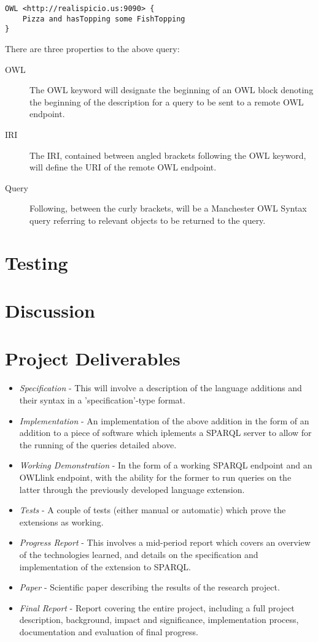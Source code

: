 \documentclass{article}
\begin{document}
\begin{lstlisting}
OWL <http://realispicio.us:9090> {
    Pizza and hasTopping some FishTopping
}
\end{lstlisting}

There are three properties to the above query:

\begin{description}
    \item[OWL] The OWL keyword will designate the beginning of an OWL block
    denoting the beginning of the description for a query to be sent to a remote
    OWL endpoint.
    \item[IRI] The IRI, contained between angled brackets following the OWL
    keyword, will define the URI of the remote OWL endpoint.
    \item[Query] Following, between the curly brackets, will be a Manchester OWL
    Syntax query referring to relevant objects to be returned to the query.
\end{description}

\section{Testing}

\section{Discussion}

\section{Project Deliverables}

\begin{itemize}
  \item \emph{Specification} - This will involve a description of the language additions 
  and their syntax in a 'specification'-type format. 
  \item \emph{Implementation} - An implementation of the above addition in the
  form of an addition to a piece of software which iplements a SPARQL server to
  allow for the running of the queries detailed above.
  \item \emph{Working Demonstration} - In the form of a working SPARQL endpoint
  and an OWLlink endpoint, with the ability for the former to run queries on the
  latter through the previously developed language extension.
  \item \emph{Tests} - A couple of tests (either manual or automatic) which
  prove the extensions as working.
  \item \emph{Progress Report} - This involves a mid-period report which covers
  an overview of the technologies learned, and details on the specification and 
  implementation of the extension to SPARQL.
  \item \emph{Paper} - Scientific paper describing the results of the research
  project.
  \item \emph{Final Report} - Report covering the entire project, including
  a full project description, background, impact and significance, 
  implementation process, documentation and evaluation of final progress.
\end{itemize}
\end{document}
